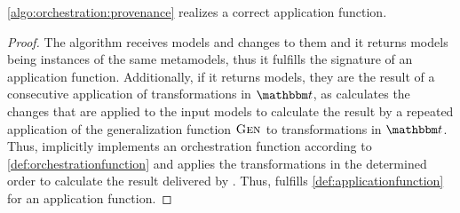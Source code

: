 \begin{theorem} \label{theorem:provenance_correctness}
    \autoref{algo:orchestration:provenance} realizes a correct application function. %
\end{theorem}
\begin{proof}
    The algorithm receives models and changes to them and it returns models being instances of the same metamodels, thus it fulfills the signature of an application function.
    Additionally, if it returns models, they are the result of a consecutive application of transformations in $\transformationset{T}$, as  calculates the changes that are applied to the input models to calculate the result by a repeated application of the generalization function $\textsc{Gen}_{}$ to transformations in $\transformationset{T}$.
    Thus,  implicitly implements an orchestration function according to \autoref{def:orchestrationfunction} and applies the transformations in the determined order to calculate the result delivered by .
    Thus,  fulfills \autoref{def:applicationfunction} for an application function.


\end{proof}
